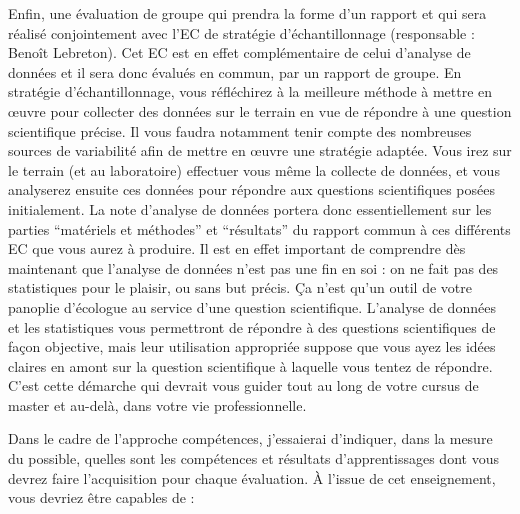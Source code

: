 \documentclass[
  a4paper,
]{article}
\begin{document}
\begin{enumerate}
  Enfin, une évaluation de groupe qui prendra la forme d'un rapport et qui sera réalisé conjointement avec l'EC de stratégie d'échantillonnage (responsable : Benoît Lebreton). Cet EC est en effet complémentaire de celui d'analyse de données et il sera donc évalués en commun, par un rapport de groupe. En stratégie d'échantillonnage, vous réfléchirez à la meilleure méthode à mettre en œuvre pour collecter des données sur le terrain en vue de répondre à une question scientifique précise. Il vous faudra notamment tenir compte des nombreuses sources de variabilité afin de mettre en œuvre une stratégie adaptée. Vous irez sur le terrain (et au laboratoire) effectuer vous même la collecte de données, et vous analyserez ensuite ces données pour répondre aux questions scientifiques posées initialement. La note d'analyse de données portera donc essentiellement sur les parties ``matériels et méthodes'' et ``résultats'' du rapport commun à ces différents EC que vous aurez à produire. Il est en effet important de comprendre dès maintenant que l'analyse de données n'est pas une fin en soi : on ne fait pas des statistiques pour le plaisir, ou sans but précis. Ça n'est qu'un outil de votre panoplie d'écologue au service d'une question scientifique. L'analyse de données et les statistiques vous permettront de répondre à des questions scientifiques de façon objective, mais leur utilisation appropriée suppose que vous ayez les idées claires en amont sur la question scientifique à laquelle vous tentez de répondre. C'est cette démarche qui devrait vous guider tout au long de votre cursus de master et au-delà, dans votre vie professionnelle.
\end{enumerate}

Dans le cadre de l'approche compétences, j'essaierai d'indiquer, dans la mesure du possible, quelles sont les compétences et résultats d'apprentissages dont vous devrez faire l'acquisition pour chaque évaluation. À l'issue de cet enseignement, vous devriez être capables de :
\end{document}
